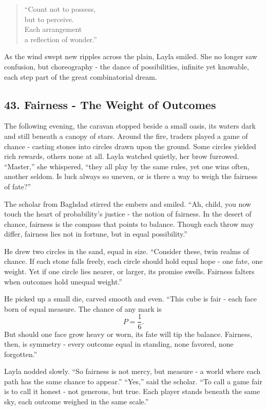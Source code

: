 \documentclass[
  letterpaper,
  DIV=11,
  numbers=noendperiod]{scrreprt}
\begin{document}
\begin{quote}
``Count not to possess,\\
but to perceive.\\
Each arrangement\\
a reflection of wonder.''
\end{quote}

As the wind swept new ripples across the plain, Layla smiled. She no
longer saw confusion, but choreography - the dance of possibilities,
infinite yet knowable, each step part of the great combinatorial dream.

\subsection{43. Fairness - The Weight of
Outcomes}\label{fairness---the-weight-of-outcomes}

The following evening, the caravan stopped beside a small oasis, its
waters dark and still beneath a canopy of stars. Around the fire,
traders played a game of chance - casting stones into circles drawn upon
the ground. Some circles yielded rich rewards, others none at all. Layla
watched quietly, her brow furrowed. ``Master,'' she whispered, ``they
all play by the same rules, yet one wins often, another seldom. Is luck
always so uneven, or is there a way to weigh the fairness of fate?''

The scholar from Baghdad stirred the embers and smiled. ``Ah, child, you
now touch the heart of probability's justice - the notion of fairness.
In the desert of chance, fairness is the compass that points to balance.
Though each throw may differ, fairness lies not in fortune, but in equal
possibility.''

He drew two circles in the sand, equal in size. ``Consider these, twin
realms of chance. If each stone falls freely, each circle should hold
equal hope - one fate, one weight. Yet if one circle lies nearer, or
larger, its promise swells. Fairness falters when outcomes hold unequal
weight.''

He picked up a small die, carved smooth and even. ``This cube is fair -
each face born of equal measure. The chance of any mark is \[
P = \frac{1}{6}.
\] But should one face grow heavy or worn, its fate will tip the
balance. Fairness, then, is symmetry - every outcome equal in standing,
none favored, none forgotten.''

Layla nodded slowly. ``So fairness is not mercy, but measure - a world
where each path has the same chance to appear.'' ``Yes,'' said the
scholar. ``To call a game fair is to call it honest - not generous, but
true. Each player stands beneath the same sky, each outcome weighed in
the same scale.''
\end{document}

